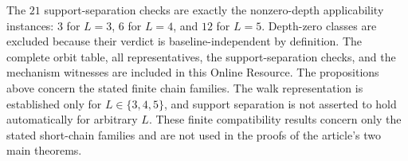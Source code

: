 \documentclass[11pt]{article}
\begin{document}
The $21$ support-separation checks are exactly the nonzero-depth applicability
instances: $3$ for $L=3$, $6$ for $L=4$, and $12$ for $L=5$.  Depth-zero
classes are excluded because their verdict is baseline-independent by
definition.  The complete orbit table, all representatives, the support-separation
checks, and the mechanism witnesses are included in this Online Resource.  The propositions above concern the stated finite
chain families.  The walk representation is established only for
$L\in\{3,4,5\}$, and support separation is not asserted to hold automatically
for arbitrary $L$.  These finite compatibility results concern only the stated short-chain
families and are not used in the proofs of the article's two main theorems.
\end{document}

